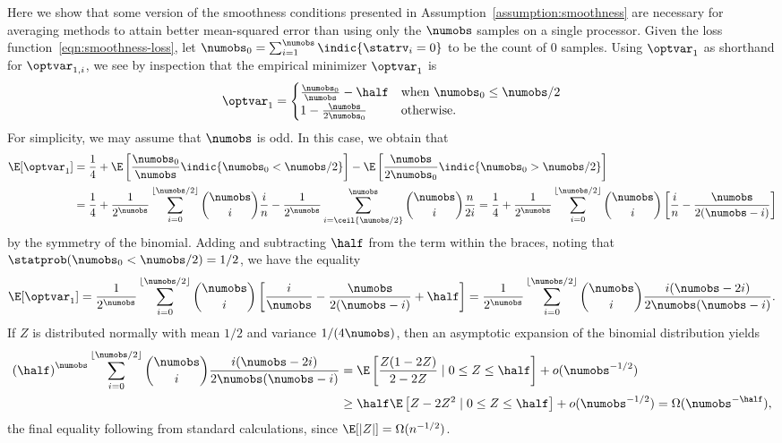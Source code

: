\documentclass[11pt,twoside]{article}
\theoremstyle{definition}
\begin{document}
Here we show that some version of the smoothness conditions presented
in Assumption~\ref{assumption:smoothness} are necessary for averaging
methods to attain better mean-squared error than using only the
$\numobs$ samples on a single processor.  Given the loss
function~\eqref{eqn:smoothness-loss}, let $\numobs_0 =
\sum_{i=1}^\numobs \indic{\statrv_i = 0}$ to be the count of 0
samples. Using $\optvar_1$ as shorthand for $\optvar_{1,i}$, we see by
inspection that the empirical minimizer $\optvar_1$ is
\begin{equation*}
  \optvar_1 = 
  \begin{cases}
  \frac{\numobs_0}{\numobs} - \half & \mbox{when} ~ \numobs_0 \le \numobs / 2
  \\
  1 - \frac{\numobs}{2 \numobs_0} & \mbox{otherwise.}
  \end{cases}
\end{equation*}
For simplicity, we may assume that $\numobs$ is odd. In this case, we
obtain that
\begin{align*}
  \E[\optvar_1] & = \frac{1}{4} + \E\left[
    \frac{\numobs_0}{\numobs} \indic{\numobs_0 < \numobs/2} \right] -
  \E\left[\frac{\numobs}{2 \numobs_0} \indic{\numobs_0 > \numobs / 2}\right] \\
  & = \frac{1}{4} + \frac{1}{2^\numobs}
  \sum_{i=0}^{\floor{\numobs/2}}
  \binom{\numobs}{i} \frac{i}{n}
  - \frac{1}{2^\numobs}
  \sum_{i = \ceil{\numobs/2}}^{\numobs}
  \binom{\numobs}{i} \frac{n}{2i}
  = \frac{1}{4} + \frac{1}{2^\numobs}
  \sum_{i=0}^{\floor{\numobs/2}}
  \binom{\numobs}{i} \left[\frac{i}{n}
    - \frac{\numobs}{2(\numobs - i)}\right]
\end{align*}
by the symmetry of the binomial. Adding and subtracting $\half$ from the term
within the braces, noting that $\statprob(\numobs_0 < \numobs/2) = 1/2$, we
have the equality
\begin{equation*}
  \E[\optvar_1]
  = \frac{1}{2^\numobs} \sum_{i=0}^{\floor{\numobs/2}}
  \binom{\numobs}{i} \left[\frac{i}{\numobs}
    - \frac{\numobs}{2(\numobs - i)}
    + \half\right]
  = \frac{1}{2^\numobs}
  \sum_{i=0}^{\floor{\numobs/2}}
  \binom{\numobs}{i} \frac{i (\numobs - 2i)}{2 \numobs(\numobs - i)}.
\end{equation*}
%
If $Z$ is distributed normally with mean $1/2$ and variance
$1/(4\numobs)$, then an asymptotic expansion of the binomial
distribution yields
\begin{align*}
  \left(\half\right)^\numobs
  \sum_{i=0}^{\floor{\numobs/2}}
  \binom{\numobs}{i} \frac{i (\numobs - 2i)}{2 \numobs(\numobs - i)}
  & = \E\left[\frac{Z(1 - 2 Z)}{2 - 2 Z} \mid 0 \le Z \le \half\right]
  + o(\numobs^{-1/2}) \\
  & \ge \half \E\left[Z - 2Z^2 \mid 0 \le Z \le \half\right]
  + o(\numobs^{-1/2})
  = \Omega(\numobs^{-\half}),
\end{align*}
the final equality following from standard calculations, since $\E[|Z|]
= \Omega(n^{-1/2})$.
\end{document}

